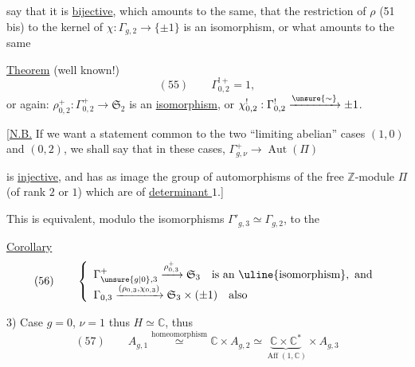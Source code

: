 
 say that it is \uline{bijective}, 
which amounts to the same, that the restriction of $\rho$ (51 bis) to the kernel  of $\chi:\Gamma_{g,2}\longrightarrow\{\pm1\}$ is an isomorphism, or what amounts to the same

\uline{Theorem} (well known!)
\[
(55)\qquad\Gamma^{!+}_{0,2}=1,
\]
or again:
$\rho^+_{0,2}:\Gamma^+_{0,2}\longrightarrow\mathfrak S_2$ is an \uline{isomorphism}, or $\chi^!_{0,2}:\Gamma^!_{0,2}\xrightarrow{\unsure{\sim}}\pm1$.

[\uline{N.B.} If we want a statement common to the  two ``limiting abelian'' cases $(1,0)$ and $(0,2)$, we shall say that in these cases, $\Gamma^+_{g,\nu}\longrightarrow\operatorname{Aut}(\Pi)$

is \uline{injective}, and has as image  the group of automorphisms of the free $\mathbb{Z}$-module $\Pi$ (of rank $2$ or $1$) which are of \uline{determinant $1$}.]

This is equivalent, modulo the isomorphisms $\Gamma'_{g,3}\simeq\Gamma_{g,2}$, to the 

\uline{Corollary}
\[
(56)\qquad\left\{\begin{array}{l}
\Gamma^+_{\unsure{g|0},3}\xrightarrow{\rho^+_{0,3}}\mathfrak S_3\quad\text{is an }\uline{\text{isomorphism}},\text{ and}\\
\Gamma_{0,3}\xrightarrow{(\rho_{0,3},\chi_{0,3})}\mathfrak S_3\times(\pm1)\quad\text{also}
\end{array}\right.
\]


3) Case $g=0$, $\nu=1$ thus $H\simeq\mathbb{C}$, thus
\[
(57)\qquad A_{g,1}\overset{\text{homeomorphism}}{\simeq}\mathbb{C}\times A_{g,2}\simeq\underbrace{\mathbb{C}\times\mathbb{C}^*}_{\operatorname{Aff}(1,\mathbb{C})}\times A_{g,3}
\]

